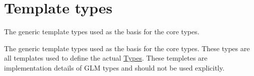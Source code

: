 \hypertarget{group__core__template}{\section{Template types}
\label{group__core__template}
}


The generic template types used as the basis for the core types.  


The generic template types used as the basis for the core types. These types are all templates used to define the actual \hyperlink{group__core__types}{Types}. These templetes are implementation details of G\-L\-M types and should not be used explicitly. 